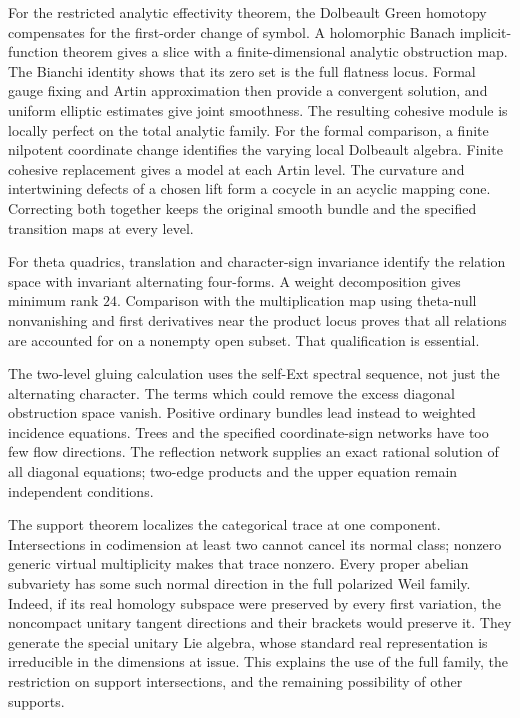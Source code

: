 \documentclass[11pt]{article}
\theoremstyle{definition}
\theoremstyle{remark}
\begin{document}
For the restricted analytic effectivity theorem, the Dolbeault
Green homotopy compensates for the first-order change of symbol.
A holomorphic Banach implicit-function theorem gives a slice with
a finite-dimensional analytic obstruction map. The Bianchi
identity shows that its zero set is the full flatness locus.
Formal gauge fixing and Artin approximation then provide a
convergent solution, and uniform elliptic estimates give joint
smoothness. The resulting cohesive module is locally perfect
on the total analytic family.
For the formal comparison, a finite nilpotent coordinate change
identifies the varying local Dolbeault algebra. Finite cohesive
replacement gives a model at each Artin level. The curvature and
intertwining defects of a chosen lift form a cocycle in an acyclic
mapping cone. Correcting both together keeps the original smooth
bundle and the specified transition maps at every level.

For theta quadrics, translation and character-sign invariance identify
the relation space with invariant alternating four-forms. A weight
decomposition gives minimum rank $24$. Comparison with the
multiplication map using theta-null nonvanishing and first derivatives near the product locus proves that all relations are
accounted for on a nonempty open subset. That qualification is essential.

The two-level gluing calculation uses the self-Ext spectral sequence,
not just the alternating character. The terms which could remove the
excess diagonal obstruction space vanish. Positive ordinary bundles
lead instead to weighted incidence equations. Trees and the specified
coordinate-sign networks have too few flow directions. The reflection
network supplies an exact rational solution of all diagonal equations;
two-edge products and the upper equation remain independent conditions.

The support theorem localizes the categorical trace at one component.
Intersections in codimension at least two cannot cancel its normal
class; nonzero generic virtual multiplicity makes that trace nonzero.
Every proper abelian subvariety has some such normal direction
in the full polarized Weil family. Indeed, if its real homology
subspace were preserved by every first variation, the noncompact
unitary tangent directions and their brackets would preserve it.
They generate the special unitary Lie algebra, whose standard real
representation is irreducible in the dimensions at issue. This
explains the use of the full family, the restriction on support
intersections, and the remaining possibility of other supports.
\end{document}
